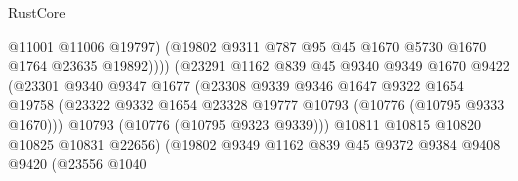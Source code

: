 \begin{lexlean}{RustCore}
\begin{coremodule}
                                        @11001
                                        @11006
                                        @19797)
                                      (@19802
                                        @9311
                                        @787
                                        @95
                                        @45
                                        @1670
                                        @5730
                                        @1670
                                        @1764
                                        @23635
                                        @19892))))
                                (@23291
                                  @1162
                                  @839
                                  @45
                                  @9340
                                  @9349
                                  @1670
                                  @9422
                                  (@23301
                                    @9340
                                    @9347
                                    @1677
                                    (@23308
                                      @9339
                                      @9346
                                      @1647
                                      @9322
                                      @1654
                                      @19758
                                      (@23322
                                        @9332
                                        @1654
                                        @23328
                                        @19777
                                        @10793
                                        (@10776 (@10795 @9333 @1670)))
                                      @10793
                                      (@10776 (@10795 @9323 @9339)))
                                    @10811
                                    @10815
                                    @10820
                                    @10825
                                    @10831
                                    @22656)
                                  (@19802
                                    @9349
                                    @1162
                                    @839
                                    @45
                                    @9372
                                    @9384
                                    @9408
                                    @9420
                                    (@23556
                                      @1040

\end{coremodule}
\end{lexlean}
